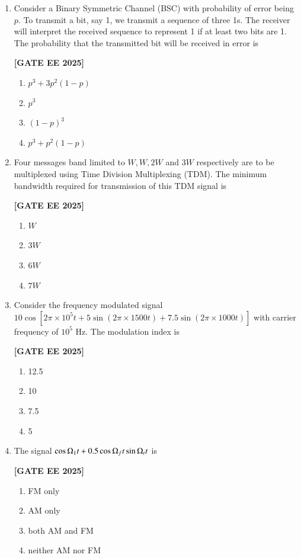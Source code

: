 \documentclass[12pt]{article}
\begin{document}
\begin{enumerate}[leftmargin=*, label=\textbf{Q.\arabic*:}]
\item Consider a Binary Symmetric Channel (BSC) with probability of error being $p$. To transmit a bit, say 1, we transmit a sequence of three 1s. The receiver will interpret the received sequence to represent 1 if at least two bits are 1. The probability that the transmitted bit will be received in error is
 
\noindent \textbf{[GATE EE 2025]}
\begin{enumerate}
  \item $p^3 + 3p^2(1-p)$
  \item $p^3$
  \item $(1-p)^3$
  \item $p^3 + p^2(1-p)$
\end{enumerate}

\item Four messages band limited to $W, W, 2W$ and $3W$ respectively are to be multiplexed using Time Division Multiplexing (TDM). The minimum bandwidth required for transmission of this TDM signal is
 
\noindent \textbf{[GATE EE 2025]}
\begin{enumerate}
  \item $W$
  \item $3W$
  \item $6W$
  \item $7W$
\end{enumerate}

\item Consider the frequency modulated signal $10\cos[2\pi \times 10^5 t + 5\sin(2\pi \times 1500 t) + 7.5\sin(2\pi \times 1000 t)]$ with carrier frequency of $10^5$ Hz. The modulation index is
 
\noindent \textbf{[GATE EE 2025]}
\begin{enumerate}
  \item 12.5
  \item 10
  \item 7.5
  \item 5
\end{enumerate}

\item The signal $\cos \ohm_1 t + 0.5 \cos \ohm_f t \sin \ohm_t t$ is
 
\noindent \textbf{[GATE EE 2025]}
\begin{enumerate}
  \item FM only
  \item AM only
  \item both AM and FM
  \item neither AM nor FM
\end{enumerate}

\end{enumerate}
\end{document}
